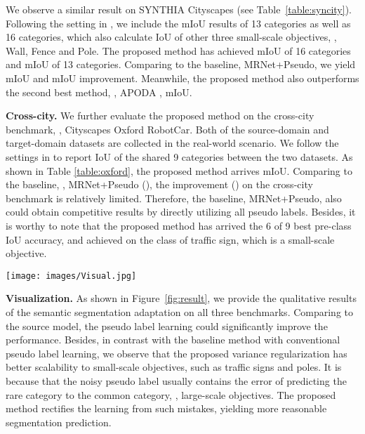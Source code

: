 We observe a similar result on SYNTHIA  Cityscapes (see  Table~\ref{table:syncity}). Following the setting in \cite{zou2018unsupervised,zou2019confidence}, we include the mIoU results of 13 categories as well as 16 categories, which also calculate IoU of other three small-scale objectives, \ie, Wall, Fence and Pole. The proposed method has achieved  mIoU of 16 categories and  mIoU of 13 categories. Comparing to the baseline, MRNet+Pseudo, we yield  mIoU and  mIoU improvement. Meanwhile, the proposed method also outperforms the second best method, \ie, APODA \cite{yang2020adversarial},  mIoU. 

\noindent\textbf{Cross-city.} We further evaluate the proposed method on the cross-city benchmark, \ie, Cityscapes  Oxford RobotCar. Both of the source-domain and target-domain datasets are collected in the real-world scenario. We follow the settings in \cite{tsai2019domain} to report IoU of the shared 9 categories between the two datasets. As shown in Table \ref{table:oxford}, the proposed method arrives  mIoU. Comparing to the baseline, \ie, MRNet+Pseudo (), the improvement () on the cross-city benchmark is relatively limited. Therefore, the baseline, MRNet+Pseudo, also could obtain competitive results by directly utilizing all pseudo labels. Besides, it is worthy to note that the proposed method has arrived the 6 of 9 best pre-class IoU accuracy, and achieved  on the class of traffic sign, which is a small-scale objective. 

\begin{figure*}[t]
\begin{center}
     \texttt{[image: images/Visual.jpg]}
\end{center} 
      \caption{  Qualitative results of semantic segmentation adaptation on GTA5  Cityscapes, SYNTHIA  Cityscapes and Cityscapes  Oxford RobotCar. We show the original target image, the ground-truth segmentation, the output of the source model, \ie, MRNet, and the baseline, \ie, MRNet+Pseudo. Our results are in the right column. (Best viewed in \emph{color}). }
      \label{fig:result}
\end{figure*}

\noindent\textbf{Visualization.} As shown in Figure~\ref{fig:result}, we provide the qualitative results of the semantic segmentation adaptation on all three benchmarks. Comparing to the source model, the pseudo label learning could significantly improve the performance. Besides, in contrast with the baseline method with conventional pseudo label learning, we observe that the proposed variance regularization has better scalability to small-scale objectives, such as traffic signs and poles. 
It is because that the noisy pseudo label usually contains the error of predicting the rare category to the common category, \ie, large-scale objectives. The proposed method rectifies the learning from such mistakes, yielding more reasonable segmentation prediction. 

